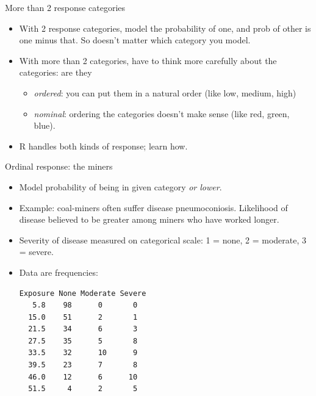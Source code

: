 \documentclass[unknownkeysallowed]{beamer}\usepackage[]{graphicx}\usepackage[]{color}
\begin{document}
\begin{frame}{More than 2 response categories}

  \begin{itemize}
  \item With 2 response categories, model the probability of one, and prob of other is one minus that. So doesn't matter which category you model.
  \item With more than 2 categories, have to think more carefully about the categories: are they
    \begin{itemize}
    \item {\em ordered}: you can put them in a natural order (like low, medium, high)
    \item {\em nominal}: ordering the categories doesn't make sense (like red, green, blue).
    \end{itemize}
  \item R handles both kinds of response; learn how.
  \end{itemize}
  
\end{frame}

\begin{frame}[fragile]{Ordinal response: the miners}


  \begin{itemize}
  \item 
Model probability of being in given category {\em or lower}.
\item Example: coal-miners often suffer disease pneumoconiosis. Likelihood of disease believed to be greater 
among miners who have worked longer. 
\item Severity of disease measured on categorical scale: 1 = none, 2
= moderate, 3 = severe.
\item Data are frequencies:
\begin{verbatim}
Exposure None Moderate Severe
   5.8    98      0       0
  15.0    51      2       1
  21.5    34      6       3
  27.5    35      5       8
  33.5    32      10      9
  39.5    23      7       8
  46.0    12      6      10
  51.5     4      2       5
\end{verbatim}
  
\end{itemize}
\end{frame}
\end{document}
